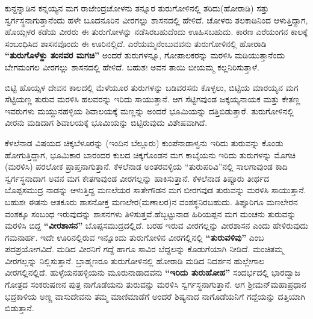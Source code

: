 ಕುನ್ದನ್ನಾಡಿನ ಕನ್ನಯ್ಯನ ಮಗ ರಾಜೇಂದ್ರಚೋಳನು ತನ್ನೂರ ತುರುಗೋಳಿನಲ್ಲಿ ತರಿದು(ಹೋರಾಡಿ) ಸತ್ತು ಸ್ವರ್ಗಸ್ಥನಾಗುತ್ತಾನೆಂದು ಹಳೇ ಬೂದನೂರಿನ ವೀರಗಲ್ಲು ಶಾಸನದಲ್ಲಿ ಹೇಳಿದೆ. ಚೋಳರು ತಲಕಾಡಿನಿಂದ ಆಳುತ್ತಿದ್ದಾಗ, ಹೊಯ್ಸಳರ ಕಡೆಯ ವೀರರು ಈ ತುರುಗೋಳನ್ನು ನಡೆಸಿರಬಹುದೆಂದು ಊಹಿಸಬಹುದು. ಕಾರಣ ಎರೆಯಂಗನ ಕಾಲಕ್ಕೆ ಸಂಬಂಧಿಸಿದ ಶಾಸನವೊಂದು ಈ ಊರಿನಲ್ಲಿದೆ. ಎರೆಯಮ್ಮನೆಂಬುವವನು ತುರುಗೋಳಿನಲ್ಲಿ ಹೋರಾಡಿ \textbf{“ತುರುಗೊಳೆಳ್ದು ತಂನವರ ಮಗಚಿ”} ಅಂದರೆ ತುರುಗಳನ್ನೂ, ಗೋಪಾಲಕರನ್ನು ಮರಳಿಸಿ ಮಡಿಯುತ್ತಾನೆಂದು ಬೇಗಮಂಗಲ ವೀರಗಲ್ಲು ಶಾಸನದಲ್ಲಿ ಹೇಳಿದೆ. ಬಹುಶಃ ಅವನ ತಾಯಿ ಬೀಯಮ್ಮ ಕಲ್ಲನಿರಿಸುತ್ತಾಳೆ.

ಬಿಟ್ಟಿ ಹೊಯ್ಸಳ ದೇವನ ಕಾಲದಲ್ಲಿ ಮೆಳೆಯೂರ ತುರುಗಳನ್ನು ಬಡಿವರಸನು ಕೊಳ್ಳಲು, ಬಿಟ್ಟಿಯ ಮಾರಯ್ಯನ ಮಗ ಸೆಟ್ಟಿಯಣ್ಣ ತುರುವ ಮರಳಿಸಿ ಹಲವರನ್ನು ಇರಿದು ಸಾಯುತ್ತಾನೆ. ಆಗ ಸೆಟ್ಟಿಗವುಂಡ ಜಕ್ಕಯ್ಯನಾಯಕ ಮತ್ತು ಕೇತಣ್ಣ ಇವರುಗಳು ಮಯ್ದುನಹಳ್ಳಿಯ ಶಿವಾಲಯಕ್ಕೆ ಮಣ್ಣನ್ನು ಅಂದರೆ ಭೂಮಿಯನ್ನು ದತ್ತಿಬಿಡುತ್ತಾರೆ. ತುರುಗೋಳಿನಲ್ಲಿ ವೀರನು ಮಡಿದಾಗ ಶಿವಾಲಯಕ್ಕೆ ಭೂಮಿಯನ್ನು ಬಿಟ್ಟಿರುವುದು ವಿಶೇಷವಾಗಿದೆ.

ಕೆಳಲೆನಾಡ ವಿಷಯದ ಚಿಕ್ಕಬೆಳೂರನ್ನು (ಇಂದಿನ ಬೆಲ್ಲೂರು) ಕುಂಪೆನಾಡಾಳ್ವನು ಇರಿದು ತುರುವನ್ನು ಕೊಂಡು ಹೋಗುತ್ತಿದ್ದಾಗ, ಭೂಮಿಕಾರ ಬಾರಂದರ ಕುಲದ ಚಿಕ್ಕಗೊಂಡನ ಮಗ ಕಾಬೈಯನು ಇರಿದು ತುರುಗಳನ್ನು ಮೊಗಚಿ (ಮರಳಿಸಿ) ಪರಲೋಕ ಪ್ರಾಪ್ತನಾಗುತ್ತಾನೆ. ಕೆಳಲೆನಾಡ ಅಂತರವಳ್ಳಿಯ “ತುರುಪರಿವಿ”ನಲ್ಲಿ ಸಾಲಗಾವುಂಡ ಕಾದಿ ಸ್ವರ್ಗಸ್ಥನಾದಾಗ ಅವನ ಮಗ ಕೇತಗಾವುಂಡ ವೀರಗಲ್ಲನ್ನು ಹಾಕಿಸುತ್ತಾನೆ. ಕೆಳಲೆನಾಡ ತಿಪ್ಪೂರು ತೀರ್ಥದ ಬೊಪ್ಪಸಮುದ್ರ ನಾಡನ್ನು ಆಳುತ್ತಿದ್ದ ಮಣಲೆಯರ ಸಾತೇಗೌಡನ ಮಗ ಬೀರಗವುಡ ತುರುವನ್ನು ಮರಳಿಸಿ ಸಾಯುತ್ತಾನೆ. ಬಹುಶಃ ಈತನು ಆತಕೂರು ಶಾಸನೋಕ್ತ ಮಣಲೇರ(ಮಣಾಲರ)ನ ವಂಶಸ್ಥನಿರಬಹುದು. ತಿಪ್ಪೂರಿಗೂ ಮಣಲೇರನ ವಂಶಕ್ಕೂ ಸಂಬಂಧ ಇರುವುದನ್ನು ಶಾಸನಗಳು ತಿಳಿಸುತ್ತವೆ.ಹೆಬ್ಬಟ್ಟುನಾಡ ಹಿರಿಯಪ್ಪನ ಮಗ ಮಂಚನು ತುರುವನ್ನು ಮರಳಿಸಿ ಬಿದ್ದ \textbf{“ವೀರಶಾಸನ”} ಬೊಪ್ಪಸಮುದ್ರದಲ್ಲಿದೆ. ಬರಹ ಇರುವ ವೀರಗಲ್ಲನ್ನು ವೀರಶಾಸನ ಎಂದು ಹೇಳಿರುವುದು ಗಮನಾರ್ಹ. ಇದೇ ಊರಿನಲ್ಲಿರುವ ಇನ್ನೊಂದು ತುರುಗೋಳಿನ ವೀರಗಲ್ಲಿನಲ್ಲಿ \textbf{“ತುರುವಳಿವು”} ಎಂಬ ಪದಪ್ರಯೋಗವಿದೆ. ಮಡಿದ ವೀರನಿಗೆ ಗದ್ದೆ ಹಾಗೂ ಸಾವಿರ ಬೆದ್ದಲನ್ನು ಕೊಡುಗೆಯಾಗಿ ನೀಡಿದೆ. ಮಂಚಿತಮ್ಮ ವೀರಗಲ್ಲನ್ನು ನಿಲ್ಲಿಸುತ್ತಾನೆ. ಬ್ರಾಹ್ಮಣರೂ ತುರುಗೋಳಿನಲ್ಲಿ ಹೋರಾಡಿ ಮಡಿದ ನಿದರ್ಶನ ಹುಲ್ಲೇಗಾಲ ವೀರಗಲ್ಲಿನಲ್ಲಿದೆ. ಹುಳ್ಳೆಯನಹಳ್ಳಿಯನು ಮೂರುನಾಡಾದವನು \textbf{“ಇರಿದು ತುರುಹೋಹ”} ಸಂದರ್ಭದಲ್ಲಿ ಭಾರದ್ವಾಜ ಗೋತ್ರದ ಸಂಕರುಷಣನ ಪುತ್ರ ನಾಗೊಡೆಯನು ತುರುವನ್ನು ಮರಳಿಸಿ ಸ್ವರ್ಗಸ್ಥನಾಗುತ್ತಾನೆ. ಆಗ ಶ‍್ರೀಮನ್​ಮಹಾಪ್ರಧಾನ ಭದ್ರಕಾಳಿಯ ಅಣ್ಣ ವಾಸುದೇವನು ತಮ್ಮ ಮಾಣಿಮಾಡೆಗೆ ಅಂದರೆ ಶಿಷ್ಯನಾದ ನಾಗೊಡೆಯನಿಗೆ ಗದ್ದೆಯನ್ನು ದತ್ತಿಯಾಗಿ ಬಿಡುತ್ತಾನೆ.


